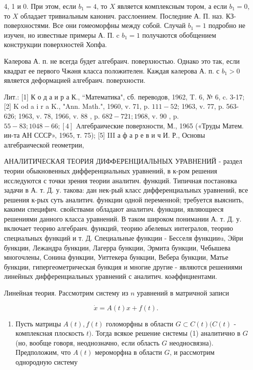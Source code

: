 \documentclass[10pt]{article}
\begin{document}
4, 1 и 0. При этом, если $b_{1}=4$, то $X$ является комплексным тором, а если $b_{1}=0$, то $X$ обладает тривиальным канонич. расслоением. Последние А. П. наз. КЗ-поверхностями. Все они гомеоморфны между собой. Случай $b_{1}=1$ подробно не изучен, но известные примеры А. П. c $b_{1}=1$ получаются обобщением конструкции поверхностей Хопфа.



Кәлерова А. п. не всегда будет алгебраич. поверхностью. Однако это так, если квадрат ее первого Чжәня класса положителен. Каждая кәлерова А. п. с $b_{1}>0$ является деформацией алгебраич. поверхности.



Лит.: [1] К о д а и р а К., “Математика", сб. переводов, 1962, T. 6, № 6, c. 3-17; [2] K od a i r a K., "Ann. Math.", 1960, v. 71, p. $111-52$; 1963, v. 77, p. 563-626; 1963, v. 78, 1966, v. 88 , p. $682-721 ; 1968$, v. 90 , p. $55-83 ; 1048-66 ;[4]$ Aлгебраические поверхности, М., 1965 («Труды Матем. ин-та АН СССР», 1965, т. 75); [5] III а ф а р е в и ч И. Р., Основы алгебраической геометрии,



АНАЛИТИЧЕСКАЯ ТЕОРИЯ ДИФФЕРЕНЦИАЛЬНЫХ УРАВНЕНИЙ - раздел теории обыкновенных дифференциальных уравнений, в к-ром решения исследуются с точки зрения теории аналитич. функций. Типичная постановка задачи в А. т. Д. у. такова: дан нек-рый класс дифференциальных уравнений, все решения к-рых суть аналитич. функции одной переменной; требуется выяснить, какими специфич. свойствами обладают аналитич. функции, являющиеся решениями данного класса уравнений. В таком широком понимании А. т. Д. у. включает теорию алгебраич. функций, теорию абелевых интегралов, теорию специальных функций и т. Д. Специальные функции - Бесселя функцииu, Эйри бункции, Лежандра бункции, Лагерра бункции, Эрмита бункции, Чебышева многочлены, Сонина функции, Уиттекера бункции, Вебера бункции, Матье бункции, гипергеометрическая бункция и многие другие - являются решениями линейных дифференциальных уравнений с аналитич. коәффициентами.



Линейная теория. Рассмотрим систему из $n$ уравнений в матричной записи



\[

\dot{x}=A(t) x+f(t) \text {. }

\]



\begin{enumerate}

  \item Пусть матрицы $A(t), f(t)$ голоморфны в области $G \subset C(t)(C(t)$ - комплексная плоскость $t)$. Тогда всякое решение системы (1) аналитично в $G$ (но, вообще говоря, неоднозначно, если область $G$ неодносвязна). Предположим, что $A(t)$ мероморфна в области $G$, и рассмотрим однородную систему

\end{enumerate}
\end{document}
